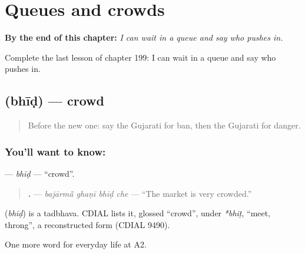 
\chapter{Queues and crowds}
\label{ch:gu-queues-and-crowds}

\begin{chapteropening}
\textbf{By the end of this chapter:} \emph{I can wait in a queue and say who pushes in.}

Complete the last lesson of chapter 199: I can wait in a queue and say who pushes in.
\end{chapteropening}

\section[\texorpdfstring{\gu{ભીડ} (bhīḍ)}{ભીડ (bhīḍ)}]{ (bhīḍ) — crowd}

\label{lesson:GU-C199-bhid}



\begin{quote}
Before the new one: say the Gujarati for ban, then the Gujarati for danger.
\end{quote}

\subsection*{You'll want to know: }
\textbf{} — \emph{bhīḍ} — \textquotedblleft{}crowd\textquotedblright{}.

\begin{quote}
\textbf{   .} — \emph{bajārmā̃ ghaṇī bhīḍ che} — \textquotedblleft{}The market is very crowded.\textquotedblright{}
\end{quote}

\begin{cousinweb}
\textbf{} (\emph{bhīḍ}) is a tadbhava. CDIAL lists it, glossed \textquotedblleft{}crowd\textquotedblright{}, under \emph{*bhiṭ}, \textquotedblleft{}meet, throng\textquotedblright{}, a reconstructed form (CDIAL 9490).
\end{cousinweb}

\begin{grammarlens}[title={What you've built}]
One more word for everyday life at A2.
\end{grammarlens}


